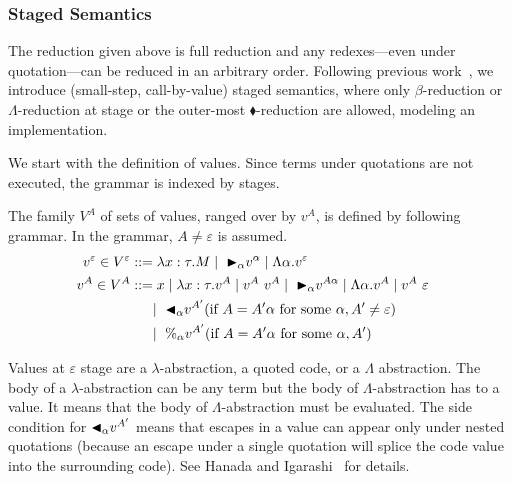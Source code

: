 
\subsubsection{Staged Semantics}

The reduction given above is full reduction and any redexes---even
under quotation---can be reduced in an arbitrary order.  
Following previous work~\cite{Hanada2014}, 
we introduce (small-step, call-by-value) staged semantics, 
where only $\beta$-reduction or $\Lambda$-reduction at stage or the outer-most $\blacklozenge$-reduction are allowed, 
modeling an implementation.

We start with the definition of values. Since terms under quotations are
not executed, the grammar is indexed by stages.

\begin{definition}[Values]
	The family $V^A$ of sets of values, ranged over by $v^A$,
	is defined by following grammar.  In the grammar, $A \neq \varepsilon$ is assumed.
	\begin{align*}
		v^\varepsilon \in V^\varepsilon & ::= \lambda x:\tau.M \mid\ {\mathop{\blacktriangleright}}_\alpha v^\alpha \mid \Lambda\alpha.v^\varepsilon                                       & \\
		v^A \in V^A                     & ::= x \mid \lambda x:\tau.v^A \mid v^A\ v^A \mid\ {\mathop{\blacktriangleright}}_\alpha v^{A\alpha} \mid \Lambda\alpha.v^A \mid v^A\ \varepsilon & \\
		                                & \quad\   \mid\ {\mathop{\blacktriangleleft}}_\alpha v^{A'} (\text{if } A = A'\alpha \text{ for some } \alpha, A' \neq \varepsilon)             & \\
		                                & \quad\   \mid\ \%_\alpha v^{A'} (\text{if } A = A'\alpha  \text{ for some } \alpha, A')
	\end{align*}
\end{definition}

Values at $\varepsilon$ stage are a $\lambda$-abstraction, a quoted code,
or a $\Lambda$ abstraction.  The body of a $\lambda$-abstraction can
be any term but the body of $\Lambda$-abstraction has to a value.  It
means that the body of $\Lambda$-abstraction must be evaluated.  The
side condition for ${\mathop{\blacktriangleleft}}_\alpha v^{A'}$ means that escapes in a value
can appear only under nested quotations (because an escape under a
single quotation will splice the code value into the surrounding
code).  See Hanada and Igarashi~\cite{Hanada2014} for details.

